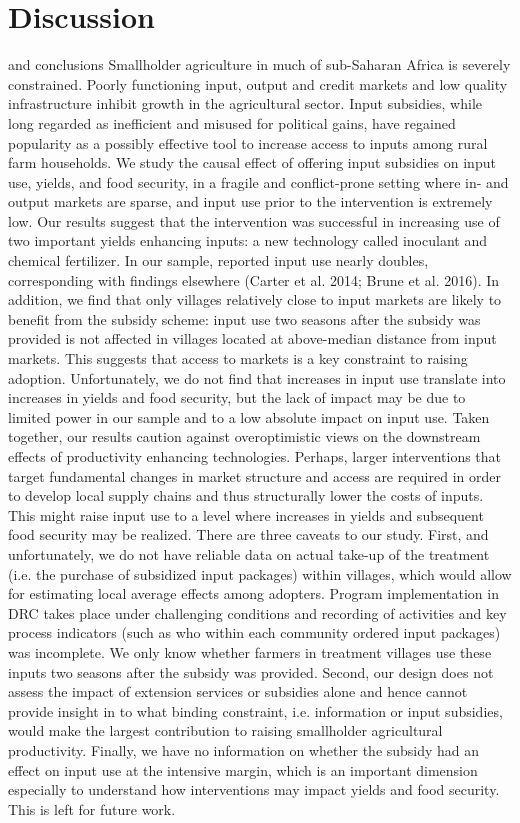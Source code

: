 \section{Discussion} and conclusions 
Smallholder agriculture in much of sub-Saharan Africa is severely constrained. Poorly functioning input, output and credit markets and low quality infrastructure inhibit growth in the agricultural sector. Input subsidies, while long regarded as inefficient and misused for political gains, have regained popularity as a possibly effective tool to increase access to inputs among rural farm households. We study the causal effect of offering input subsidies on input use, yields, and food security, in a fragile and conflict-prone setting where in- and output markets are sparse, and input use prior to the intervention is extremely low. 
Our results suggest that the intervention was successful in increasing use of two important yields enhancing inputs: a new technology called inoculant and chemical fertilizer. In our sample, reported input use nearly doubles, corresponding with findings elsewhere (Carter et al. 2014; Brune et al. 2016). In addition, we find that only villages relatively close to input markets are likely to benefit from the subsidy scheme: input use two seasons after the subsidy was provided is not affected in villages located at above-median distance from input markets. This suggests that access to markets is a key constraint to raising adoption. Unfortunately, we do not find that increases in input use translate into increases in yields and food security, but the lack of impact may be due to limited power in our sample and to a low absolute impact on input use. Taken together, our results caution against overoptimistic views on the downstream effects of productivity enhancing technologies. Perhaps, larger interventions that target fundamental changes in market structure and access are required in order to develop local supply chains and thus structurally lower the costs of inputs. This might raise input use to a level where increases in yields and subsequent food security may be realized. 
There are three caveats to our study. First, and unfortunately, we do not have reliable data on actual take-up of the treatment (i.e. the purchase of subsidized input packages) within villages, which would allow for estimating local average effects among adopters. Program implementation in DRC takes place under challenging conditions and recording of activities and key process indicators (such as who within each community ordered input packages) was incomplete. We only know whether farmers in treatment villages use these inputs two seasons after the subsidy was provided. Second, our design does not assess the impact of extension services or subsidies alone and hence cannot provide insight in to what binding constraint, i.e. information or input subsidies, would make the largest contribution to raising smallholder agricultural productivity. Finally, we have no information on whether the subsidy had an effect on input use at the intensive margin, which is an important dimension especially to understand how interventions may impact yields and food security. This is left for future work. 


